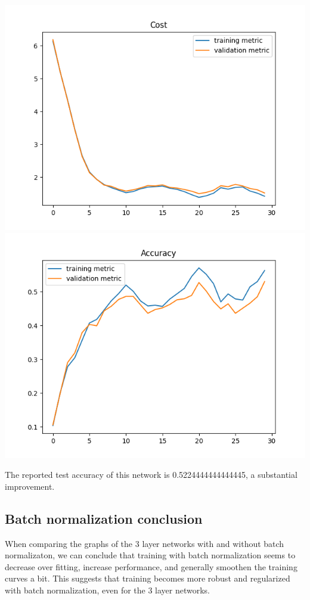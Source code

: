\documentclass[11pt,a4paper]{article}
\begin{document}
\includegraphics[width=\textwidth]{optimal_cost_k=9.png}
\includegraphics[width=\textwidth]{optimal_accuracy_k=9.png}

The reported test accuracy of this network is 0.5224444444444445, a substantial improvement.

\subsection{Batch normalization conclusion}

When comparing the graphs of the 3 layer networks with and without batch normalizaton, we can conclude that training with batch normalization seems to decrease over fitting, increase performance, and generally smoothen the training curves a bit. This suggests that training becomes more robust and regularized with batch normalization, even for the 3 layer networks.\\
\end{document}
